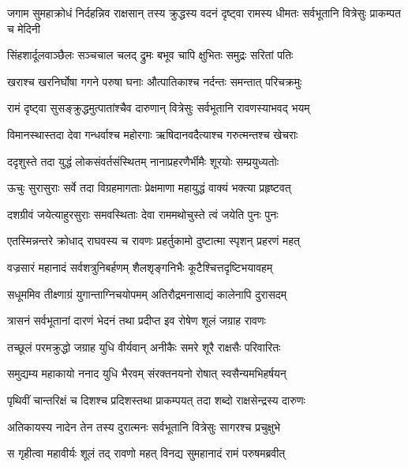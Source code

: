 
\threelineshloka
{जगाम सुमहाक्रोधं निर्दहन्निव राक्षसान्}
{तस्य क्रुद्धस्य वदनं दृष्ट्वा रामस्य धीमतः}
{सर्वभूतानि वित्रेसुः प्राकम्पत च मेदिनी} %

\twolineshloka
{सिंहशार्दूलवाञ्छैलः सञ्चचाल चलद् द्रुमः}
{बभूव चापि क्षुभितः समुद्रः सरितां पतिः} %

\twolineshloka
{खराश्च खरनिर्घोषा गगने परुषा घनाः}
{औत्पातिकाश्च नर्दन्तः समन्तात् परिचक्रमुः} %

\twolineshloka
{रामं दृष्ट्वा सुसङ्क्रुद्धमुत्पातांश्चैव दारुणान्}
{वित्रेसुः सर्वभूतानि रावणस्याभवद् भयम्} %

\twolineshloka
{विमानस्थास्तदा देवा गन्धर्वाश्च महोरगाः}
{ऋषिदानवदैत्याश्च गरुत्मन्तश्च खेचराः} %

\twolineshloka
{ददृशुस्ते तदा युद्धं लोकसंवर्तसंस्थितम्}
{नानाप्रहरणैर्भीमैः शूरयोः सम्प्रयुध्यतोः} %

\twolineshloka
{ऊचुः सुरासुराः सर्वे तदा विग्रहमागताः}
{प्रेक्षमाणा महायुद्धं वाक्यं भक्त्या प्रहृष्टवत्} %

\twolineshloka
{दशग्रीवं जयेत्याहुरसुराः समवस्थिताः}
{देवा राममथोचुस्ते त्वं जयेति पुनः पुनः} %

\twolineshloka
{एतस्मिन्नन्तरे क्रोधाद् राघवस्य च रावणः}
{प्रहर्तुकामो दुष्टात्मा स्पृशन् प्रहरणं महत्} %

\twolineshloka
{वज्रसारं महानादं सर्वशत्रुनिबर्हणम्}
{शैलशृङ्गनिभैः कूटैश्चित्तदृष्टिभयावहम्} %

\twolineshloka
{सधूममिव तीक्ष्णाग्रं युगान्ताग्निचयोपमम्}
{अतिरौद्रमनासाद्यं कालेनापि दुरासदम्} %

\twolineshloka
{त्रासनं सर्वभूतानां दारणं भेदनं तथा}
{प्रदीप्त इव रोषेण शूलं जग्राह रावणः} %

\twolineshloka
{तच्छूलं परमक्रुद्धो जग्राह युधि वीर्यवान्}
{अनीकैः समरे शूरै राक्षसैः परिवारितः} %

\twolineshloka
{समुद्यम्य महाकायो ननाद युधि भैरवम्}
{संरक्तनयनो रोषात् स्वसैन्यमभिहर्षयन्} %

\twolineshloka
{पृथिवीं चान्तरिक्षं च दिशश्च प्रदिशस्तथा}
{प्राकम्पयत् तदा शब्दो राक्षसेन्द्रस्य दारुणः} %

\twolineshloka
{अतिकायस्य नादेन तेन तस्य दुरात्मनः}
{सर्वभूतानि वित्रेसुः सागरश्च प्रचुक्षुभे} %

\twolineshloka
{स गृहीत्वा महावीर्यः शूलं तद् रावणो महत्}
{विनद्य सुमहानादं रामं परुषमब्रवीत्} %

